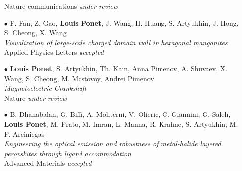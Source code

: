\documentclass[10pt, a4paper]{article}
\begin{document}
\begin{itemize}
	Nature communications {\it under review}
	\item[$\bullet$]
	F. Fan, Z. Gao, {\bf Louis Ponet}, J. Wang, H. Huang, S. Artyukhin, J. Hong, S. Cheong, X. Wang\\
	{\it Visualization of large-scale charged domain wall in hexagonal manganites}\\
	Applied Physics Letters {\it accepted}
	\item[$\bullet$]
	{\bf Louis Ponet}, S. Artyukhin, Th. Kain, Anna Pimenov, A. Shuvaev, X. Wang, S. Cheong, M. Mostovoy, Andrei Pimenov\\
	{\it Magnetoelectric Crankshaft}\\
	Nature {\it under review}
	\item[$\bullet$]
	B. Dhanabalan, G. Biffi, A. Moliterni, V. Olieric, C. Giannini, G. Saleh, {\bf Louis Ponet}, M. Prato, M. Imran, L. Manna, R. Krahne, S. Artyukhin, M. P. Arciniegas\\
	{\it Engineering the optical emission and robustness of metal-halide layered perovskites through ligand accommodation}\\
	Advanced Materials {\it accepted}
\end{itemize}%
% 
% 
% 
% 
\end{document}
